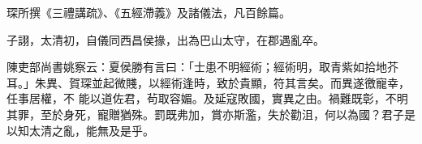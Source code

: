 \begin{pinyinscope}
 琛所撰《三禮講疏》、《五經滯義》及諸儀法，凡百餘篇。



 子詡，太清初，自儀同西昌侯掾，出為巴山太守，在郡遇亂卒。



 陳吏部尚書姚察云：夏侯勝有言曰：「士患不明經術；經術明，取青紫如拾地芥耳。」朱異、賀琛並起微賤，以經術逢時，致於貴顯，符其言矣。而異遂徼寵幸，任事居權，不
 能以道佐君，茍取容媚。及延寇敗國，實異之由。禍難既彰，不明其罪，至於身死，寵贈猶殊。罰既弗加，賞亦斯濫，失於勸沮，何以為國？君子是以知太清之亂，能無及是乎。



\end{pinyinscope}